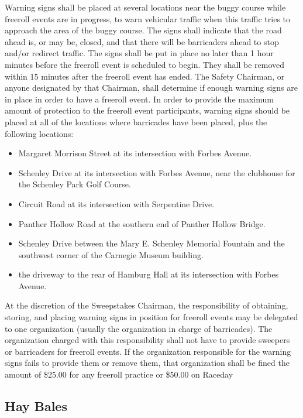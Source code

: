 	Warning signs shall be placed at several locations near the buggy course while freeroll events are in progress, to warn vehicular traffic when this traffic tries to approach the area of the buggy course. The signs shall indicate that the road ahead is, or may be, closed, and that there will be barricaders ahead to stop and/or redirect traffic. The signs shall be put in place no later than 1 hour minutes before the freeroll event is scheduled to begin. They shall be removed within 15 minutes after the freeroll event has ended. The Safety Chairman, or anyone designated by that Chairman, shall determine if enough warning signs are in place in order to have a freeroll event. In order to provide the maximum amount of protection to the freeroll event participants, warning signs should be placed at all of the locations where barricades have been placed, plus the following locations:

	\begin{itemize}
		\item Margaret Morrison Street at its intersection with Forbes Avenue.
		\item Schenley Drive at its intersection with Forbes Avenue, near the clubhouse for the Schenley Park Golf Course.
		\item Circuit Road at its intersection with Serpentine Drive.
		\item Panther Hollow Road at the southern end of Panther Hollow Bridge.
		\item Schenley Drive between the Mary E. Schenley Memorial Fountain and the southwest corner of the Carnegie Museum building.
		\item the driveway to the rear of Hamburg Hall at its intersection with Forbes Avenue.
	\end{itemize}

	At the discretion of the Sweepstakes Chairman, the responsibility of obtaining, storing, and placing warning signs in position for freeroll events may be delegated to one organization (usually the organization in charge of barricades). The organization charged with this responsibility shall not have to provide sweepers or barricaders for freeroll events. If the organization responsible for the warning signs fails to provide them or remove them, that organization shall be fined the amount of \$25.00 for any freeroll practice or \$50.00 on Raceday
	
	
\subsection{Hay Bales}
\label{subsec:Haybales}


